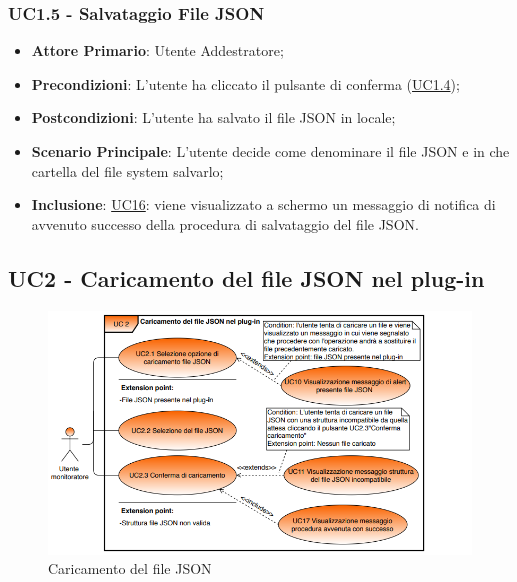 	\label{par:UC1.5}
	\subsubsection{UC1.5 - Salvataggio File JSON}
		\begin{itemize}
			\item\textbf{Attore Primario}: Utente Addestratore;
			\item\textbf{Precondizioni}: L’utente ha cliccato il pulsante di conferma (\hyperref[par:UC1.4]{UC1.4});
			\item\textbf{Postcondizioni}: L’utente ha salvato il file JSON in locale;
			\item\textbf{Scenario Principale}: L’utente decide come denominare il file JSON e in che cartella del file system salvarlo;  
			\item\textbf{Inclusione}: \hyperref[par:UC16]{UC16}: viene visualizzato a schermo un messaggio di notifica di avvenuto successo della procedura di salvataggio del file JSON.			
		\end{itemize}


	\label{par:UC2}
	\subsection{UC2 - Caricamento del file JSON nel plug-in}
	
	\begin{figure}[H]
		\centering
		\includegraphics[scale=0.70]{../Analisi_dei_requisiti/img/Diagrammi_UML/UC2_Caricamento_file_JSON_nel_plug-in.png}
		\caption{Caricamento del file JSON}
	\end{figure}	
		
